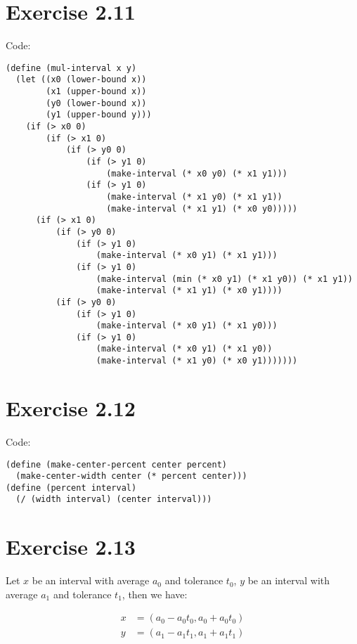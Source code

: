 \documentclass[../main.tex]{subfiles}
\begin{document}
\section{Exercise 2.11}

Code:

\begin{lstlisting}
(define (mul-interval x y)
  (let ((x0 (lower-bound x))
        (x1 (upper-bound x))
        (y0 (lower-bound x))
        (y1 (upper-bound y)))
    (if (> x0 0)
        (if (> x1 0)
            (if (> y0 0)
                (if (> y1 0)
                    (make-interval (* x0 y0) (* x1 y1)))
                (if (> y1 0)
                    (make-interval (* x1 y0) (* x1 y1))
                    (make-interval (* x1 y1) (* x0 y0)))))
      (if (> x1 0)
          (if (> y0 0)
              (if (> y1 0)
                  (make-interval (* x0 y1) (* x1 y1)))
              (if (> y1 0)
                  (make-interval (min (* x0 y1) (* x1 y0)) (* x1 y1))
                  (make-interval (* x1 y1) (* x0 y1))))
          (if (> y0 0)
              (if (> y1 0)
                  (make-interval (* x0 y1) (* x1 y0)))
              (if (> y1 0)
                  (make-interval (* x0 y1) (* x1 y0))
                  (make-interval (* x1 y0) (* x0 y1)))))))
\end{lstlisting}

\section{Exercise 2.12}

Code:

\begin{lstlisting}
(define (make-center-percent center percent)
  (make-center-width center (* percent center)))
(define (percent interval)
  (/ (width interval) (center interval)))
\end{lstlisting}

\section{Exercise 2.13}

Let $x$ be an interval with average $a_0$ and tolerance $t_0$,
 $y$ be an interval with average $a_1$ and tolerance $t_1$, then we have:

\begin{align*}
x &= (a_0 - a_0 t_0, a_0 + a_0 t_0) \\
y &= (a_1 - a_1 t_1, a_1 + a_1 t_1)
\end{align*}
\end{document}
